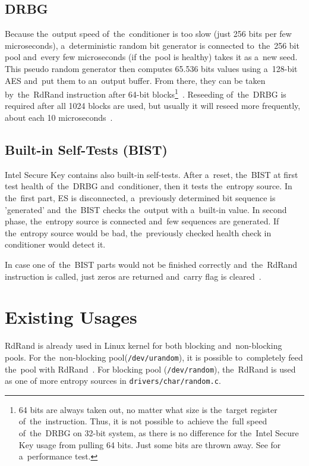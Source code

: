 \subsection{DRBG}\label{subsec:DRBG}
\par{
Because the~output speed of~the~conditioner is too slow (just 256 bits per few 
microseconds), 
a~deterministic random bit generator is connected to~the~256 bit pool 
and~every few microseconds (if the~pool is healthy) takes it as a~new seed. 
This pseudo random generator then computes 65.536 bits values using 
a~128-bit AES and~put them to an~output buffer. 
From there, they can be taken by~the~RdRand instruction after 64-bit 
blocks\footnote{64 bits are always taken out, no matter what size is 
the~target register of~the~instruction. Thus, it is not possible to~achieve the~full 
speed of~the~DRBG on 32-bit system, as there is no difference for the~Intel 
Secure Key usage from pulling 64 bits. Just some bits are thrown away. 
See  for a~performance test.}~\cite{AnalysisOfDRNG,UnderstandingRdRandElectronic}. 
Reseeding of~the~DRBG is required after all 1024 blocks are used, 
but usually it will reseed more frequently, 
about each 10 microseconds~\cite[Chapter~4.4]{IntelDRNGGuide}.
}
\subsection{Built-in Self-Tests (BIST)}
\par{
Intel Secure Key contains also built-in self-tests. After a~reset, the~BIST at first test 
health of~the~DRBG and~conditioner, then it tests the~entropy source. In the~first 
part, ES is disconnected, a~previously determined bit sequence is 'generated' 
and~the~BIST checks the~output with a~built-in value. In second phase, 
the~entropy source is connected and~few sequences are generated. 
If the~entropy source would be bad, the~previously checked health check in conditioner would detect it. 
}

\par{
In case one of~the~BIST parts would not be finished correctly and~the~RdRand 
instruction is called, just zeros are returned and~carry flag is cleared~\cite{AnalysisOfDRNG}.
}

\section{Existing Usages} 
\par{
RdRand is already used in Linux kernel for both blocking and~non-blocking pools. For the~non-blocking pool({\tt /dev/urandom}), it is possible to~completely feed the~pool with RdRand~\cite{KernelRdRand}. For blocking pool ({\tt /dev/random}), the~RdRand is used as one of more entropy sources in {\tt drivers/char/random.c}.
}

